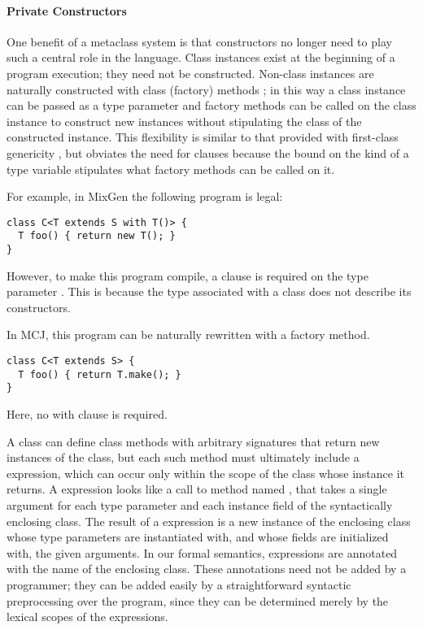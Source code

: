 \documentclass{acm-sigplan}
\begin{document}
\paragraph{Private Constructors}
\label{privconst}

One benefit of a metaclass system is that constructors no longer need
to play such a central role in the language. Class instances exist at
the beginning of a program execution; they need not be
constructed. Non-class instances are naturally constructed with class
(factory) methods \cite{GOF}; in this way a class instance can be
passed as a type parameter and factory methods can be called on the
class instance to construct new instances without stipulating the
class of the constructed instance. This flexibility is similar to that
provided with first-class genericity \cite{NextGen, MixGen}, but
obviates the need for {} clauses because the bound on the
kind of a type variable stipulates what factory methods can be called
on it.  

For example, in MixGen the following program is legal:

\begin{verbatim}
class C<T extends S with T()> {
  T foo() { return new T(); }
}
\end{verbatim}

However, to make this program compile, a  clause is required
on the type parameter .  This is because the type associated
with a class does not describe its constructors.  

In MCJ, this program can be naturally rewritten with a factory method.

\begin{verbatim}
class C<T extends S> {
  T foo() { return T.make(); }
}
\end{verbatim}

Here, no with clause is required.  

A class can define class methods with arbitrary signatures that return
new instances of the class, but each such method must ultimately
include a {} expression, which can occur only within the
scope of the class whose instance it returns. A {} expression
looks like a call to method named {}, that takes a single
argument for each type parameter and each instance field of the
syntactically enclosing class. The result of a {} expression
is a new instance of the enclosing class whose type parameters are
instantiated with, and whose fields are initialized with, the given
arguments. In our formal semantics, {} expressions are
annotated with the name of the enclosing class. These annotations need
not be added by a programmer; they can be added easily by a
straightforward syntactic preprocessing over the program, since they
can be determined merely by the lexical scopes of the {}
expressions.
\end{document}
